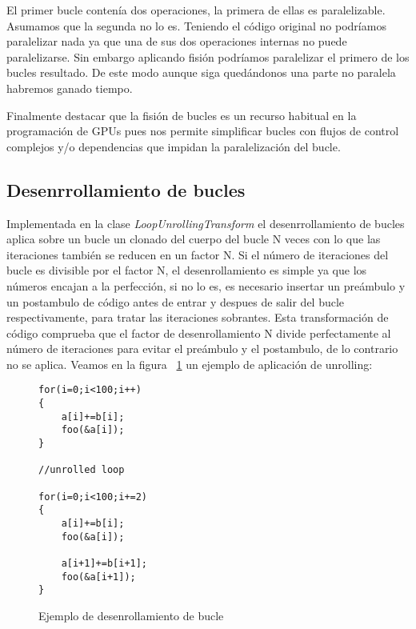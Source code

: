 El primer bucle contenía dos operaciones, la primera de ellas es paralelizable. Asumamos que la segunda no lo es. Teniendo el código original no podríamos paralelizar nada ya que una de sus dos operaciones internas no puede paralelizarse. Sin embargo aplicando fisión podríamos paralelizar el primero de los bucles resultado. De este modo aunque siga quedándonos una parte no paralela habremos ganado tiempo.

Finalmente destacar que la fisión de bucles es un recurso habitual en la programación de GPUs pues nos permite simplificar bucles con flujos de control complejos y/o dependencias que impidan la paralelización del bucle.

\subsection{Desenrrollamiento de bucles}

Implementada en la clase \textit{LoopUnrollingTransform} el desenrrollamiento de bucles aplica sobre un bucle un clonado del cuerpo del bucle N veces con lo que las iteraciones también se reducen en un factor N. Si el número de iteraciones del bucle es divisible por el factor N, el desenrollamiento es simple ya que los números encajan a la perfección, si no lo es, es necesario insertar un preámbulo y un postambulo de código antes de entrar y despues de salir del bucle respectivamente, para tratar las iteraciones sobrantes. Esta transformación de código comprueba que el factor de desenrollamiento N divide perfectamente al número de iteraciones para evitar el preámbulo y el postambulo, de lo contrario no se aplica.
Veamos en la figura ~\ref{FIG:UnrollExample} un ejemplo de aplicación de unrolling:

\begin{figure}[t]
\begin{lstlisting}
for(i=0;i<100;i++)
{
	a[i]+=b[i];
	foo(&a[i]);
}

//unrolled loop

for(i=0;i<100;i+=2)
{
	a[i]+=b[i];
	foo(&a[i]);

	a[i+1]+=b[i+1];
	foo(&a[i+1]);
}
\end{lstlisting}
\caption{Ejemplo de desenrollamiento de bucle}
\label{FIG:UnrollExample}
\end{figure}

